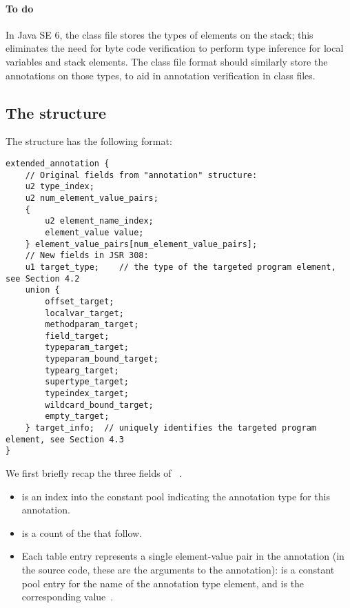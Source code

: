 \documentclass[10pt]{article}
\begin{document}
\paragraph{To do}
In Java SE 6, the class file stores the types of elements on the stack;
this eliminates the need for byte code verification to perform type
inference for local variables and stack elements.  The class file format
should similarly store the annotations on those types, to aid in annotation
verification in class files.



\subsection{The  structure\label{class-file:ext}}

The \extendedannotation structure has the following format:

\begin{Verbatim}
extended_annotation {
    // Original fields from "annotation" structure:
    u2 type_index;
    u2 num_element_value_pairs;
    {
        u2 element_name_index;
        element_value value;
    } element_value_pairs[num_element_value_pairs];
    // New fields in JSR 308:
    u1 target_type;    // the type of the targeted program element, see Section 4.2
    union {
        offset_target;
        localvar_target;
        methodparam_target;
        field_target;
        typeparam_target;
        typeparam_bound_target;
        typearg_target;
        supertype_target;
        typeindex_target;
        wildcard_bound_target;
        empty_target;
    } target_info;  // uniquely identifies the targeted program element, see Section 4.3
}
\end{Verbatim}

We first briefly recap
the three fields of ~\cite[\S 4.8.15]{LindholmY99:CFF5}.

\begin{itemize}
\item {} is an index into the constant pool indicating the
  annotation type for this annotation.
\item {} is a count of the
   that follow.
\item Each  table entry represents a single
  element-value pair in the annotation (in the source code, these are the
  arguments to the annotation):   is a
  constant pool entry for the name of the annotation type element, and
   is the corresponding value~\cite[\S 4.8.15.1]{LindholmY99:CFF5}.
\end{itemize}
\end{document}
